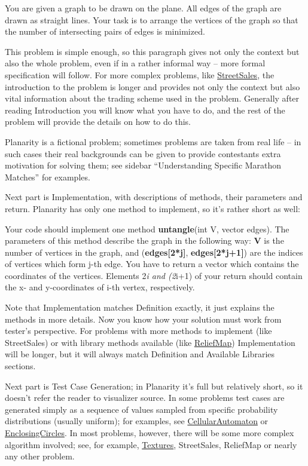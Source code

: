 You are given a graph to be drawn on the plane. All edges of the graph
are drawn as straight lines. Your task is to arrange the vertices of the
graph so that the number of intersecting pairs of edges is minimized.

This problem is simple enough, so this paragraph gives not only the
context but also the whole problem, even if in a rather informal way --
more formal specification will follow. For more complex problems, like
\href{http://community.topcoder.com/longcontest/?module=ViewProblemStatement\&rd=14354\&pm=10034}{StreetSales},
the introduction to the problem is longer and provides not only the
context but also vital information about the trading scheme used in the
problem. Generally after reading Introduction you will know what you
have to do, and the rest of the problem will provide the details on how
to do this.

Planarity is a fictional problem; sometimes problems are taken from real
life -- in such cases their real backgrounds can be given to provide
contestants extra motivation for solving them; see sidebar
``Understanding Specific Marathon Matches'' for examples.

Next part is Implementation, with descriptions of methods, their
parameters and return. Planarity has only one method to implement, so
it's rather short as well:

Your code should implement one method \textbf{untangle}(int V, vector
edges). The parameters of this method describe the graph in the
following way: \textbf{V} is the number of vertices in the graph, and
(\textbf{edges{[}2*j{]}}, \textbf{edges{[}2*j+1{]}}) are the indices of
vertices which form j-th edge. You have to return a vector which
contains the coordinates of the vertices. Elements 2\emph{i and (2}i+1)
of your return should contain the x- and y-coordinates of i-th vertex,
respectively.

Note that Implementation matches Definition exactly, it just explains
the methods in more details. Now you know how your solution must work
from tester's perspective. For problems with more methods to implement
(like StreetSales) or with library methods available (like
\href{http://community.topcoder.com/longcontest/?module=ViewProblemStatement\&rd=13766\&pm=10322}{ReliefMap})
Implementation will be longer, but it will always match Definition and
Available Libraries sections.

Next part is Test Case Generation; in Planarity it's full but relatively
short, so it doesn't refer the reader to visualizer source. In some
problems test cases are generated simply as a sequence of values sampled
from specific probability distributions (usually uniform); for examples,
see
\href{http://community.topcoder.com/longcontest/?module=ViewProblemStatement\&rd=14273\&pm=10989}{CellularAutomaton}
or
\href{http://community.topcoder.com/longcontest/?module=ViewProblemStatement\&rd=13964\&pm=10655}{EnclosingCircles}.
In most problems, however, there will be some more complex algorithm
involved; see, for example,
\href{http://community.topcoder.com/longcontest/?module=ViewProblemStatement\&rd=12203\&pm=8737}{Textures},
StreetSales, ReliefMap or nearly any other problem.

